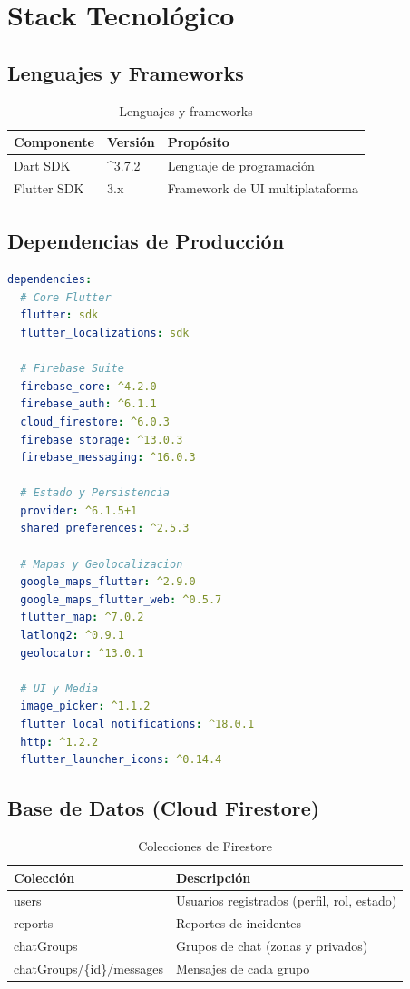 \documentclass[12pt,a4paper]{article}
\begin{document}
\section{Stack Tecnológico}

\subsection{Lenguajes y Frameworks}

\begin{table}[h]
\centering
\begin{tabular}{|l|l|l|}
\hline
\textbf{Componente} & \textbf{Versión} & \textbf{Propósito} \\
\hline
Dart SDK & \^{}3.7.2 & Lenguaje de programación \\
Flutter SDK & 3.x & Framework de UI multiplataforma \\
\hline
\end{tabular}
\caption{Lenguajes y frameworks}
\end{table}

\subsection{Dependencias de Producción}

\begin{lstlisting}[language=yaml, caption=pubspec.yaml - Dependencias]
dependencies:
  # Core Flutter
  flutter: sdk
  flutter_localizations: sdk
  
  # Firebase Suite
  firebase_core: ^4.2.0
  firebase_auth: ^6.1.1
  cloud_firestore: ^6.0.3
  firebase_storage: ^13.0.3
  firebase_messaging: ^16.0.3
  
  # Estado y Persistencia
  provider: ^6.1.5+1
  shared_preferences: ^2.5.3
  
  # Mapas y Geolocalizacion
  google_maps_flutter: ^2.9.0
  google_maps_flutter_web: ^0.5.7
  flutter_map: ^7.0.2
  latlong2: ^0.9.1
  geolocator: ^13.0.1
  
  # UI y Media
  image_picker: ^1.1.2
  flutter_local_notifications: ^18.0.1
  http: ^1.2.2
  flutter_launcher_icons: ^0.14.4
\end{lstlisting}

\subsection{Base de Datos (Cloud Firestore)}

\begin{table}[h]
\centering
\begin{tabular}{|l|l|}
\hline
\textbf{Colección} & \textbf{Descripción} \\
\hline
users & Usuarios registrados (perfil, rol, estado) \\
reports & Reportes de incidentes \\
chatGroups & Grupos de chat (zonas y privados) \\
chatGroups/\{id\}/messages & Mensajes de cada grupo \\
\hline
\end{tabular}
\caption{Colecciones de Firestore}
\end{table}
\end{document}
